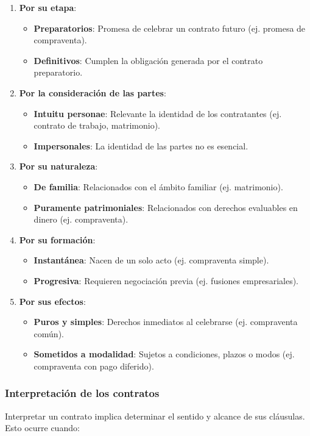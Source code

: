\documentclass{templateNote}
\begin{document}
\begin{enumerate}
    \item \textbf{Por su etapa}:
    \begin{itemize}
        \item \textbf{Preparatorios}: Promesa de celebrar un contrato futuro (ej. promesa de compraventa).
        \item \textbf{Definitivos}: Cumplen la obligación generada por el contrato preparatorio.
    \end{itemize}
    \item \textbf{Por la consideración de las partes}:
    \begin{itemize}
        \item \textbf{Intuitu personae}: Relevante la identidad de los contratantes (ej. contrato de trabajo, matrimonio).
        \item \textbf{Impersonales}: La identidad de las partes no es esencial.
    \end{itemize}
    \item \textbf{Por su naturaleza}:
    \begin{itemize}
        \item \textbf{De familia}: Relacionados con el ámbito familiar (ej. matrimonio).
        \item \textbf{Puramente patrimoniales}: Relacionados con derechos evaluables en dinero (ej. compraventa).
    \end{itemize}
    \item \textbf{Por su formación}:
    \begin{itemize}
        \item \textbf{Instantánea}: Nacen de un solo acto (ej. compraventa simple).
        \item \textbf{Progresiva}: Requieren negociación previa (ej. fusiones empresariales).
    \end{itemize}
    \item \textbf{Por sus efectos}:
    \begin{itemize}
        \item \textbf{Puros y simples}: Derechos inmediatos al celebrarse (ej. compraventa común).
        \item \textbf{Sometidos a modalidad}: Sujetos a condiciones, plazos o modos (ej. compraventa con pago diferido).
    \end{itemize}
\end{enumerate}

\subsubsection{Interpretación de los contratos}
Interpretar un contrato implica determinar el sentido y alcance de sus cláusulas. Esto ocurre cuando:
\end{document}
